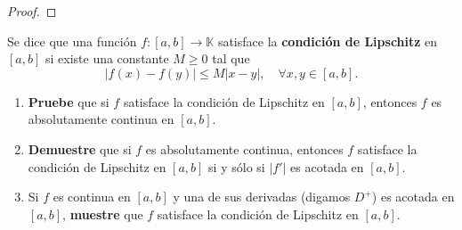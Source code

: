 \documentclass[12pt]{report}
\theoremstyle{largebreak}
\newcommand\abs[1]{\ensuremath{\lvert#1\rvert}}
\begin{document}
    \begin{proof}
        
    \end{proof}

    \begin{excer}
        Se dice que una función $f:[a,b]\rightarrow \mathbb{K}$ satisface la \textbf{condición de Lipschitz} en $[a,b]$ si existe una constante $M\geq 0$ tal que
        \begin{equation*}
            \abs{f(x)-f(y)}\leq M\abs{x-y},\quad\forall x,y\in [a,b].
        \end{equation*}
        \begin{enumerate}
            \item \textbf{Pruebe} que si $f$ satisface la condición de Lipschitz en $[a,b]$, entonces $f$ es absolutamente continua en $[a,b]$.
            \item \textbf{Demuestre} que si $f$ es absolutamente continua, entonces $f$ satisface la condición de Lipschitz en $[a,b]$ si y sólo si $\abs{f'}$ es acotada en $[a,b]$.
            \item Si $f$ es continua en $[a,b]$ y una de sus derivadas (digamos $D^+$) es acotada en $[a,b]$, \textbf{muestre} que $f$ satisface la condición de Lipschitz en $[a,b]$.
        \end{enumerate}
    \end{excer}
\end{document}
